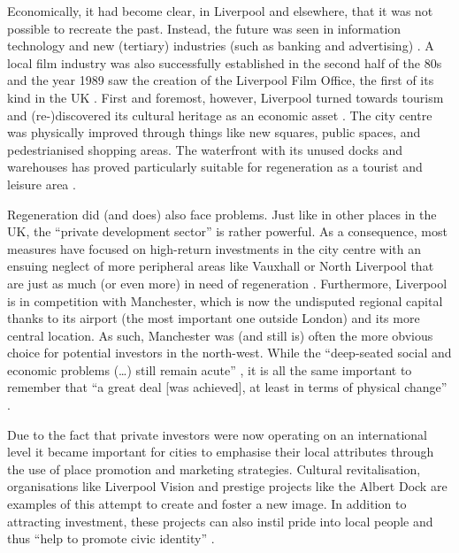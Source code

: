 Economically, it had become clear, in Liverpool and elsewhere, that it was not possible to recreate the past.
Instead, the future was seen in information technology and new (tertiary) industries (such as banking and advertising) \citep[cf.][32]{fraser2003}.
A local film industry was also successfully established in the second half of the 80s and the year 1989 saw the creation of the Liverpool Film Office, the first of its kind in the UK \citep[cf.][479]{murden2006}.
First and foremost, however, Liverpool turned towards tourism and (re-)discovered its cultural heritage as an economic asset \citep[cf.][32--33]{fraser2003}.
The city centre was physically improved through things like new squares, public spaces, and pedestrianised shopping areas.
The waterfront with its unused docks and warehouses has proved particularly suitable for regeneration as a tourist and leisure area \citep[173--174]{couch2003a}.

Regeneration did (and does) also face problems.
Just like in other places in the UK, the ``private development sector'' is rather powerful.
As a consequence, most measures have focused on high-return investments in the city centre with an ensuing neglect of more peripheral areas like Vauxhall or North Liverpool that are just as much (or even more) in need of regeneration \citep[cf.][49]{couch2003}.
Furthermore, Liverpool is in competition with Manchester, which is now the undisputed regional capital thanks to its airport (the most important one outside London) and its more central location.
As such, Manchester was (and still is) often the more obvious choice for potential investors in the north-west.
While the ``deep-seated social and economic problems (\ldots) still remain acute'' \citep[188]{fraser2003a}, it is all the same important to remember that ``a great deal [was achieved], at least in terms of physical change'' \citep[44]{couch2003}.

Due to the fact that private investors were now operating on an international level it became important for cities to emphasise their local attributes through the use of place promotion and marketing strategies.
Cultural revitalisation, organisations like Liverpool Vision and prestige projects like the Albert Dock are examples of this attempt to create and foster a new image.
In addition to attracting investment, these projects can also instil pride into local people and thus ``help to promote civic identity'' \citep[cf.][201--203]{percy2003}.

